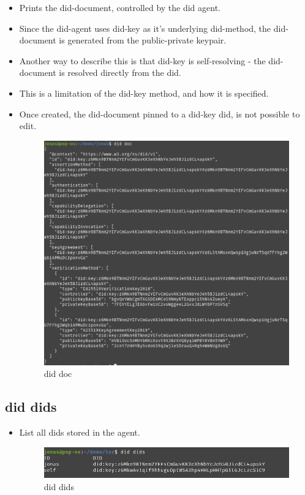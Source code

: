 \begin{itemize}
\item
  Prints the did-document, controlled by the did agent.
\item
  Since the did-agent uses did-key as it's underlying did-method, the
  did-document is generated from the public-private keypair.
\item
  Another way to describe this is that did-key is self-resolving - the
  did-document is resolved directly from the did.
\item
  This is a limitation of the did-key method, and how it is specified.
\item
  Once created, the did-document pinned to a did-key did, is not
  possible to edit.

  \begin{figure}
  \centering
  \includegraphics[width=\textwidth]{User Interface f8759a9462b24d5f95cf6123d68b89ea/Untitled 2.png}
  \caption{did doc}
  \end{figure}
\end{itemize}

\hypertarget{did-dids}{%
\subsection{did dids}\label{did-dids}}

\begin{itemize}
\item
  List all dids stored in the agent.

  \begin{figure}
  \centering
  \includegraphics[width=\textwidth]{User Interface f8759a9462b24d5f95cf6123d68b89ea/Untitled 3.png}
  \caption{did dids}
  \end{figure}
\end{itemize}

